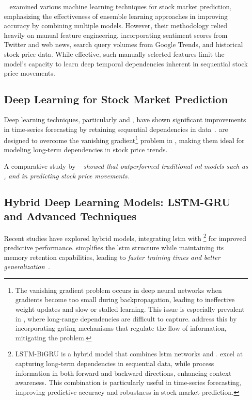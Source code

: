~\parencite{parmar2018stock} examined various machine 
learning techniques for stock market prediction, emphasizing the effectiveness of 
ensemble learning approaches in improving accuracy by combining multiple models. 
However, their methodology relied heavily on manual feature engineering, incorporating 
sentiment scores from Twitter and web news, search query volumes from Google Trends, 
and historical stock price data. While effective, such manually selected features 
limit the model's capacity to learn deep temporal dependencies inherent in sequential 
stock price movements.

\subsection{Deep Learning for Stock Market Prediction}

Deep learning techniques, particularly  and , have shown
significant improvements in time-series forecasting by retaining sequential dependencies in
data~\parencite{chang2024StockPrediction}.  are designed to overcome
the vanishing 
gradient\footnote{The vanishing gradient problem occurs in deep neural networks when
gradients become too small during backpropagation, leading to ineffective weight updates 
and slow or stalled learning. This issue is especially prevalent in , 
where long-range dependencies are difficult to capture.  address this by
incorporating gating mechanisms that regulate the flow of information, mitigating the
problem.} problem in , making them ideal for modeling long-term 
dependencies in stock price trends.

A comparative study by 
\citeauthor{nabipour2020DeepLearning}~\parencite{nabipour2020DeepLearning} \emph{showed 
that  outperformed traditional \acrfull{ml} models such as , and 
 in predicting stock price movements}. 

\subsection{Hybrid Deep Learning Models: LSTM-GRU and Advanced Techniques}

Recent studies have explored hybrid models, integrating \acrshort{lstm} with 
\footnote{LSTM-BiGRU is a hybrid model that combines \acrshort{lstm} 
networks and .  excel at capturing long-term dependencies in sequential
data, while  process information in both forward and backward directions, enhancing
context awareness. This combination is particularly useful in time-series forecasting, improving
predictive accuracy and robustness in stock market prediction.} for improved predictive performance.
 simplifies the \acrshort{lstm} structure while maintaining its memory retention
capabilities, leading to 
\emph{faster training times and better generalization}~\parencite{shaban2024SMPDL, chang2024StockPrediction}.

